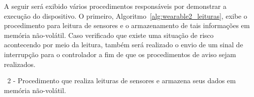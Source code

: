          A seguir será exibido vários procedimentos responsáveis por demonstrar a execução do dispositivo.         
         O primeiro, Algoritmo~\ref{alg:wearable2_leituras}, exibe o procedimento para leitura de sensores e o armazenamento de tais informações em memória não-volátil.
         Caso verificado que existe uma situação de risco acontecendo por meio da leitura, também será realizado o envio de um sinal de interrupção para o controlador a fim de que os procedimentos de aviso sejam realizados.
   
         \begin{algorithm}[h]
            
            \BlankLine
            \BlankLine
   
   
            \caption{\Wearable\ 2 - Procedimento que realiza leituras de sensores e armazena seus dados em memória não-volátil.}
            \label{alg:wearable2_leituras}
         \end{algorithm}
         
